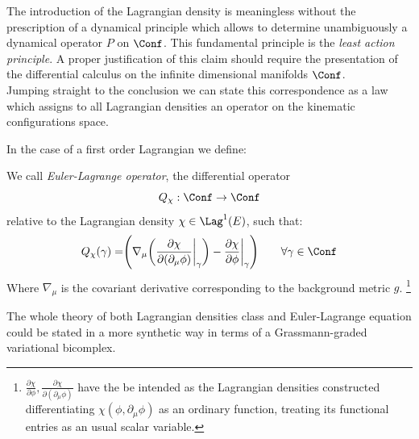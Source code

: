 \documentclass[Main]{subfiles}
\begin{document}
	\vspace{2mm}
	The introduction of the Lagrangian density is meaningless without the prescription of a dynamical principle which allows to determine unambiguously a dynamical operator $P$ on $\Conf$.
	This fundamental principle is the \emph{least action principle}.
	A proper justification of this claim should require the presentation of the differential calculus on the infinite dimensional manifolds $\Conf$. 
	\\
	Jumping straight to the conclusion we can state this correspondence as a law which assigns to all Lagrangian densities an operator on the kinematic configurations space. 
	
	In the case of a first order Lagrangian we define:
	\begin{definition}
	We call \emph{Euler-Lagrange operator}, the  differential operator
		\begin{displaymath}
			Q_\chi : \Conf \rightarrow \Conf
		\end{displaymath}
		relative to the Lagrangian density $\chi \in \Lag^1(E)$, such that:
		\begin{equation}
			Q_\chi (\gamma) = \Biggr( \nabla_\mu \biggr( \frac{\partial \chi}{\partial(\partial_\mu \phi)} \biggr\vert_\gamma \biggr) - \frac{\partial \chi}{\partial \phi}\biggr\vert_\gamma \Biggr) \qquad \forall \gamma \in \Conf
		\end{equation}
		Where $\nabla_\mu$ is the covariant derivative corresponding to the background metric $g$.
		\footnote{
		 $\frac{\partial \chi}{\partial \phi} , \frac{\partial \chi}{\partial(\partial_\mu \phi)}$ have the be intended as the Lagrangian densities constructed differentiating $\chi(\phi, \partial_\mu \phi)$ as an ordinary function, treating its functional entries as an usual scalar variable.
		}
	\end{definition}

	\begin{remark}	
		The whole theory of both Lagrangian densities class and Euler-Lagrange equation could be stated in a more synthetic way in terms of a Grassmann-graded variational bicomplex.\cite{Giachetta2009}\cite{Sardanashvily}
	\end{remark}
	
		

\end{document}
